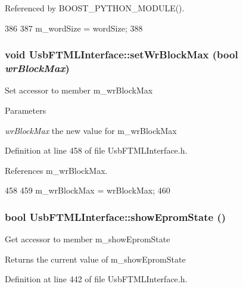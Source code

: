 Referenced by BOOST\_\-PYTHON\_\-MODULE().


\begin{DoxyCode}
386                                             {
387     m_wordSize = wordSize;
388   }
\end{DoxyCode}
\hypertarget{classUsbFTMLInterface_ab9ff3b850ed592872bd82c579052114f}{
\subsubsection[{setWrBlockMax}]{\setlength{\rightskip}{0pt plus 5cm}void UsbFTMLInterface::setWrBlockMax (bool {\em wrBlockMax})}}
\label{classUsbFTMLInterface_ab9ff3b850ed592872bd82c579052114f}
Set accessor to member m\_\-wrBlockMax 
\begin{DoxyParams}{Parameters}
\item[{\em wrBlockMax}]the new value for m\_\-wrBlockMax \end{DoxyParams}


Definition at line 458 of file UsbFTMLInterface.h.

References m\_\-wrBlockMax.


\begin{DoxyCode}
458                                        {
459     m_wrBlockMax = wrBlockMax;
460   }
\end{DoxyCode}
\hypertarget{classUsbFTMLInterface_aa62fc0edc39360eeb473fe9e91df9044}{
\subsubsection[{showEpromState}]{\setlength{\rightskip}{0pt plus 5cm}bool UsbFTMLInterface::showEpromState ()}}
\label{classUsbFTMLInterface_aa62fc0edc39360eeb473fe9e91df9044}
Get accessor to member m\_\-showEpromState \begin{DoxyReturn}{Returns}
the current value of m\_\-showEpromState 
\end{DoxyReturn}


Definition at line 442 of file UsbFTMLInterface.h.

